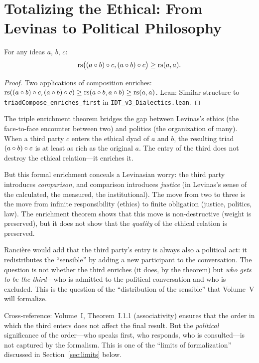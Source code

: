 \section{Totalizing the Ethical: From Levinas to Political Philosophy}

\begin{theorem}
\label{thm:triple-enriches}
For any ideas $a$, $b$, $c$:
\[
\mathrm{rs}\bigl((a \circ b) \circ c, (a \circ b) \circ c\bigr) \geq \mathrm{rs}(a, a).
\]
\end{theorem}

\begin{proof}
Two applications of composition enriches:
$\mathrm{rs}((a \circ b) \circ c, (a \circ b) \circ c) \geq
\mathrm{rs}(a \circ b, a \circ b) \geq \mathrm{rs}(a, a)$.
Lean: Similar structure to \texttt{triadCompose\_enriches\_first} in
\texttt{IDT\_v3\_Dialectics.lean}.
\end{proof}

\begin{interpretation}
The triple enrichment theorem bridges the gap between Levinas's ethics
(the face-to-face encounter between two) and politics (the organization of
many). When a third party $c$ enters the ethical dyad of $a$ and $b$, the
resulting triad $(a \circ b) \circ c$ is at least as rich as the
original $a$. The entry of the third does not destroy the ethical
relation---it enriches it.

But this formal enrichment conceals a Levinasian worry: the third party
introduces \emph{comparison}, and comparison introduces \emph{justice} (in
Levinas's sense of the calculated, the measured, the institutional). The
move from two to three is the move from infinite responsibility (ethics) to
finite obligation (justice, politics, law). The enrichment theorem shows that
this move is non-destructive (weight is preserved), but it does not show
that the \emph{quality} of the ethical relation is preserved.

Rancière would add that the third party's entry is always also a political
act: it redistributes the ``sensible'' by adding a new participant to the
conversation. The question is not whether the third enriches (it does, by
the theorem) but \emph{who gets to be the third}---who is admitted to the
political conversation and who is excluded. This is the question of the
``distribution of the sensible'' that Volume~V will formalize.

Cross-reference: Volume~I, Theorem~I.1.1 (associativity) ensures that the
order in which the third enters does not affect the final result. But the
\emph{political} significance of the order---who speaks first, who responds,
who is consulted---is not captured by the formalism. This is one of the
``limits of formalization'' discussed in Section~\ref{sec:limits} below.
\end{interpretation}

